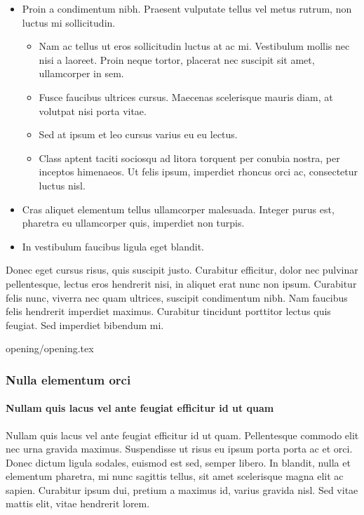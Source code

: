 \begin{itemize}
    \item Proin a condimentum nibh. Praesent vulputate tellus vel metus rutrum, non luctus mi sollicitudin. 
    \begin{itemize}
        \item Nam ac tellus ut eros sollicitudin luctus at ac mi. Vestibulum mollis nec nisi a laoreet. Proin neque tortor, placerat nec suscipit sit amet, ullamcorper in sem.
        \item Fusce faucibus ultrices cursus. Maecenas scelerisque mauris diam, at volutpat nisi porta vitae. 
        \item Sed at ipsum et leo cursus varius eu eu lectus. 
        \item Class aptent taciti sociosqu ad litora torquent per conubia nostra, per inceptos himenaeos. Ut felis ipsum, imperdiet rhoncus orci ac, consectetur luctus nisl. 
    \end{itemize}
    \item Cras aliquet elementum tellus ullamcorper malesuada. Integer purus est, pharetra eu ullamcorper quis, imperdiet non turpis.
    \item In vestibulum faucibus ligula eget blandit. 
\end{itemize}



Donec eget cursus risus, quis suscipit justo. Curabitur efficitur, dolor nec pulvinar pellentesque, lectus eros hendrerit nisi, in aliquet erat nunc non ipsum. Curabitur felis nunc, viverra nec quam ultrices, suscipit condimentum nibh. Nam faucibus felis hendrerit imperdiet maximus. Curabitur tincidunt porttitor lectus quis feugiat. Sed imperdiet bibendum mi.




                 {opening/opening.tex}



\subsubsection{Nulla elementum orci}

\paragraph{Nullam quis lacus vel ante feugiat efficitur id ut quam}

Nullam quis lacus vel ante feugiat efficitur id ut quam. Pellentesque commodo elit nec urna gravida maximus. Suspendisse ut risus eu ipsum porta porta ac et orci. Donec dictum ligula sodales, euismod est sed, semper libero. In blandit, nulla et elementum pharetra, mi nunc sagittis tellus, sit amet scelerisque magna elit ac sapien. Curabitur ipsum dui, pretium a maximus id, varius gravida nisl. Sed vitae mattis elit, vitae hendrerit lorem. 

